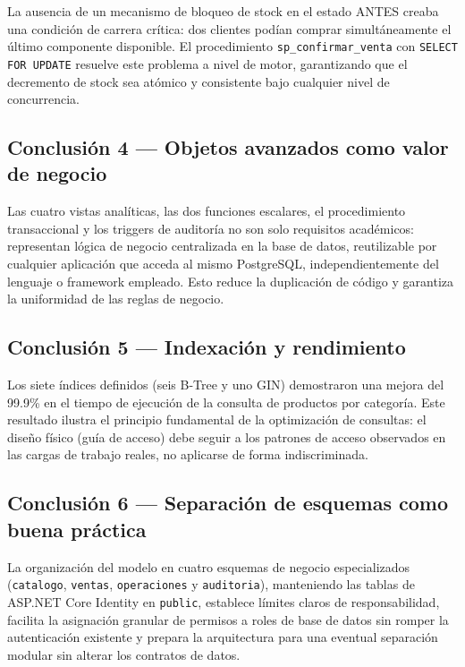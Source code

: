 La ausencia de un mecanismo de bloqueo de stock en el estado ANTES creaba una condici\'on de carrera cr\'itica: dos clientes podían comprar simult\'aneamente el \'ultimo componente disponible.
El procedimiento \texttt{sp\_confirmar\_venta} con \texttt{SELECT FOR UPDATE} resuelve este problema a nivel de motor, garantizando que el decremento de stock sea at\'omico y consistente bajo cualquier nivel de concurrencia.

\subsection{Conclusi\'on 4 --- Objetos avanzados como valor de negocio}

Las cuatro vistas anal\'iticas, las dos funciones escalares, el procedimiento transaccional y los triggers de auditor\'ia no son solo requisitos acad\'emicos: representan l\'ogica de negocio centralizada en la base de datos, reutilizable por cualquier aplicaci\'on que acceda al mismo PostgreSQL, independientemente del lenguaje o framework empleado.
Esto reduce la duplicaci\'on de c\'odigo y garantiza la uniformidad de las reglas de negocio.

\subsection{Conclusi\'on 5 --- Indexaci\'on y rendimiento}

Los siete \'indices definidos (seis B-Tree y uno GIN) demostraron una mejora del 99.9\% en el tiempo de ejecuci\'on de la consulta de productos por categor\'ia.
Este resultado ilustra el principio fundamental de la optimizaci\'on de consultas: el dise\~no f\'isico (gu\'ia de acceso) debe seguir a los patrones de acceso observados en las cargas de trabajo reales, no aplicarse de forma indiscriminada.

\subsection{Conclusi\'on 6 --- Separaci\'on de esquemas como buena pr\'actica}

La organizaci\'on del modelo en cuatro esquemas de negocio especializados (\texttt{catalogo}, \texttt{ventas}, \texttt{operaciones} y \texttt{auditoria}), manteniendo las tablas de ASP.NET Core Identity en \texttt{public}, establece l\'imites claros de responsabilidad, facilita la asignaci\'on granular de permisos a roles de base de datos sin romper la autenticaci\'on existente y prepara la arquitectura para una eventual separaci\'on modular sin alterar los contratos de datos.

